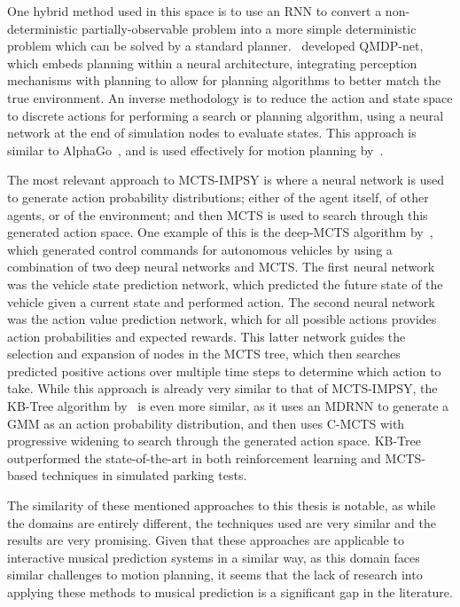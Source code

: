 One hybrid method used in this space is to use an RNN to convert a non-deterministic partially-observable problem into a more simple deterministic problem which can be solved by a standard planner.~\cite{Karkus2017QMDP} developed QMDP-net, which embeds planning within a neural architecture, integrating perception mechanisms with planning to allow for planning algorithms to better match the true environment. An inverse methodology is to reduce the action and state space to discrete actions for performing a search or planning algorithm, using a neural network at the end of simulation nodes to evaluate states. This approach is similar to AlphaGo~\citep{Silver2016AlphaGo}, and is used effectively for motion planning by~\cite{Weingertner2020MCTS}.

The most relevant approach to MCTS-IMPSY is where a neural network is used to generate action probability distributions; either of the agent itself, of other agents, or of the environment; and then MCTS is used to search through this generated action space. One example of this is the deep-MCTS algorithm by~\cite{Chen2020DeepMCTS}, which generated control commands for autonomous vehicles by using a combination of two deep neural networks and MCTS. The first neural network was the vehicle state prediction network, which predicted the future state of the vehicle given a current state and performed action. The second neural network was the action value prediction network, which for all possible actions provides action probabilities and expected rewards. This latter network guides the selection and expansion of nodes in the MCTS tree, which then searches predicted positive actions over multiple time steps to determine which action to take. While this approach is already very similar to that of MCTS-IMPSY, the KB-Tree algorithm by~\cite{Lei2021KBTree} is even more similar, as it uses an MDRNN to generate a GMM as an action probability distribution, and then uses C-MCTS with progressive widening to search through the generated action space. KB-Tree outperformed the state-of-the-art in both reinforcement learning and MCTS-based techniques in simulated parking tests.

The similarity of these mentioned approaches to this thesis is notable, as while the domains are entirely different, the techniques used are very similar and the results are very promising. Given that these approaches are applicable to interactive musical prediction systems in a similar way, as this domain faces similar challenges to motion planning, it seems that the lack of research into applying these methods to musical prediction is a significant gap in the literature.

